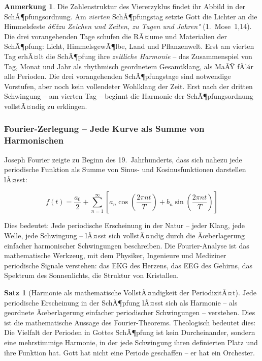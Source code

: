 ﻿\documentclass[a4paper,12pt]{article}
\theoremstyle{definition}
\newtheorem{theorem}{Satz}[section]
\newtheorem{remark}{Anmerkung}[section]
\begin{document}
\begin{remark}
	Die Zahlenstruktur des Viererzyklus findet ihr Abbild in der SchÃ¶pfungsordnung.
	Am \textit{vierten} SchÃ¶pfungstag setzte Gott die Lichter an die Himmelsfeste
	\textit{â€žzu Zeichen und Zeiten, zu Tagen und Jahren"} (1.~Mose~1,14). Die drei
	vorangehenden Tage schufen die RÃ¤ume und Materialien der SchÃ¶pfung: Licht,
	HimmelsgewÃ¶lbe, Land und Pflanzenwelt. Erst am vierten Tag erhÃ¤lt die SchÃ¶pfung
	ihre \textit{zeitliche Harmonie} -- das Zusammenspiel von Tag, Monat und Jahr
	als rhythmisch geordnetem Gesamtklang, als MaÃŸ fÃ¼r alle Perioden. Die drei
	vorangehenden SchÃ¶pfungstage sind notwendige Vorstufen, aber noch kein vollendeter
	Wohlklang der Zeit. Erst nach der dritten Schwingung -- am vierten Tag -- beginnt
	die Harmonie der SchÃ¶pfungsordnung vollstÃ¤ndig zu erklingen.
\end{remark}

\subsubsection{Fourier-Zerlegung -- Jede Kurve als Summe von Harmonischen}

Joseph Fourier zeigte zu Beginn des 19.~Jahrhunderts, dass sich nahezu jede
periodische Funktion als Summe von Sinus- und Kosinusfunktionen darstellen lÃ¤sst:

\begin{equation}
	f(t) = \frac{a_0}{2} + \sum_{n=1}^{\infty}
	\left[ a_n \cos\!\left(\frac{2\pi n t}{T}\right)
	+ b_n \sin\!\left(\frac{2\pi n t}{T}\right) \right]
\end{equation}

Dies bedeutet: Jede periodische Erscheinung in der Natur -- jeder Klang, jede
Welle, jede Schwingung -- lÃ¤sst sich vollstÃ¤ndig durch die Ãœberlagerung einfacher
harmonischer Schwingungen beschreiben. Die Fourier-Analyse ist das mathematische
Werkzeug, mit dem Physiker, Ingenieure und Mediziner periodische Signale verstehen:
das EKG des Herzens, das EEG des Gehirns, das Spektrum des Sonnenlichts, die
Struktur von Kristallen.

\begin{theorem}[Harmonie als mathematische VollstÃ¤ndigkeit der PeriodizitÃ¤t]
	Jede periodische Erscheinung in der SchÃ¶pfung lÃ¤sst sich als Harmonie --
	als geordnete Ãœberlagerung einfacher periodischer Schwingungen -- verstehen.
	Dies ist die mathematische Aussage des Fourier-Theorems. Theologisch bedeutet
	dies: Die Vielfalt der Perioden in Gottes SchÃ¶pfung ist kein Durcheinander,
	sondern eine mehrstimmige Harmonie, in der jede Schwingung ihren definierten
	Platz und ihre Funktion hat. Gott hat nicht eine Periode geschaffen -- er hat
	ein Orchester.
\end{theorem}
\end{document}
